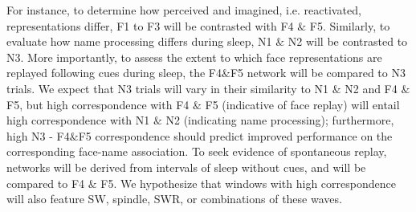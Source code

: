 For instance, to determine how perceived and imagined, i.e. reactivated, representations differ, F1 to F3 will be contrasted with F4 $\&$ F5. Similarly, to evaluate how name processing differs during sleep, N1 $\&$ N2 will be contrasted to N3. More importantly, to assess the extent to which face representations are replayed following cues during sleep, the F4$\&$F5 network will be compared to N3 trials. We expect that N3 trials will vary in their similarity to N1 $\&$ N2 and F4 $\&$ F5, but high correspondence with F4 $\&$ F5 (indicative of face replay) will entail high correspondence with N1 $\&$ N2 (indicating name processing); furthermore, high N3 - F4$\&$F5 correspondence should predict improved performance on the corresponding face-name association. To seek evidence of spontaneous replay, networks will be derived from intervals of sleep without cues, and will be compared to F4 $\&$ F5. We hypothesize that windows with high correspondence will also feature SW, spindle, SWR, or combinations of these waves.


